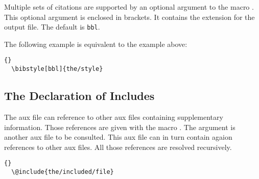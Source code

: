 Multiple sets of citations are supported by an optional argument to
the macro . This optional argument is enclosed in
brackets. It contains the extension for the output file. The default
is \texttt{bbl}.

The following example is equivalent to the example above:

\begin{lstlisting}{}
  \bibstyle[bbl]{the/style}
\end{lstlisting}

\subsection{The Declaration of Includes}

The aux file can reference to other aux files containing supplementary
information. Those references are given  with the macro
. The argument is another aux file to be consulted.
This aux file can in turn contain agaion references to other aux
files. All those references are resolved recursively.

\begin{lstlisting}{}
  \@include{the/included/file}
\end{lstlisting}


\endinput
%
